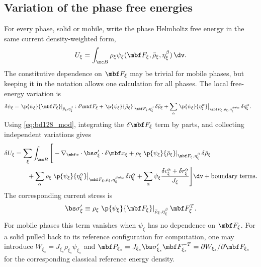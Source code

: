 \subsection{Variation of the phase free energies}
\label{sec:var_Uxi}

For every phase, solid or mobile, write the phase Helmholtz free energy in the
same current density-weighted form,
\begin{equation}
  U_\xi=\int_{\mc B}\rho_\xi\psi_\xi(\mbf F_\xi,\bar\rho_\xi,\eta_\xi^\beta)\,\dv .
  \label{eq:U_xi_uniform}
\end{equation}
The constitutive dependence on $\mbf F_\xi$ may be trivial for mobile phases,
but keeping it in the notation allows one calculation for all phases.  The local
free-energy variation is
\begin{align}
  \delta\psi_\xi
  &= \left.\p{\psi_\xi}{\mbf F_\xi}\right\vert_{\bar\rho_\xi,\eta_\xi^\beta}:\delta\mbf F_\xi
   + \left.\p{\psi_\xi}{\bar\rho_\xi}\right\vert_{\mbf F_\xi,\eta_\xi^\beta}\delta\bar\rho_\xi
   + \sum_\alpha
  \left.\p{\psi_\xi}{\eta_\xi^\alpha}\right\vert_{\mbf F_\xi,\bar\rho_\xi,\eta_\xi^{\beta\neq\alpha}}
  \delta\eta_\xi^\alpha .
  \label{eq:delta_psi_uniform}
\end{align}
Using \eqref{eq:bd128_mod}, integrating the $\delta\mbf F_\xi$ term by parts,
and collecting independent variations gives
\begin{align}
  \delta U_\xi
  &= \sum_\xi\int_{\mc B}\Bigg[
    -\nabla_{\mbf x}\cdot\bs\sigma'_\xi\cdot\delta\mbf x_\xi
    + \rho_\xi\left.\p{\psi_\xi}{\bar\rho_\xi}\right\vert_{\mbf F_\xi,\eta_\xi^\beta}\delta\bar\rho_\xi \notag\\
  &\qquad
    + \sum_\alpha \rho_\xi\left.\p{\psi_\xi}{\eta_\xi^\alpha}\right\vert_{\mbf F_\xi,\bar\rho_\xi,\eta_\xi^{\beta\neq\alpha}}\delta\eta_\xi^\alpha
    + \sum_\alpha \psi_\xi\frac{\delta c_\xi^\alpha+\delta r_\xi^\alpha}{J_\xi}
  \Bigg]\dv + \text{boundary terms}.
  \label{eq:deltaU_uniform}
\end{align}
The corresponding current stress is
\begin{align}
  \bs\sigma'_\xi
  \equiv \rho_\xi\left.\p{\psi_\xi}{\mbf F_\xi}\right\vert_{\bar\rho_\xi,\eta_\xi^\beta}\mbf F_\xi^T .
  \label{eq:var_cauchy_def}
\end{align}
For mobile phases this term vanishes when $\psi_\xi$ has no dependence on
$\mbf F_\xi$.  For a solid pulled back to its reference configuration for
computation, one may introduce $W_{\xi_s}=J_{\xi_s}\rho_{\xi_s}\psi_{\xi_s}$ and
$\mbf P_{\xi_s}=J_{\xi_s}\bs\sigma'_{\xi_s}\mbf F_{\xi_s}^{-T}
=\partial W_{\xi_s}/\partial\mbf F_{\xi_s}$ for the corresponding classical
reference energy density.



